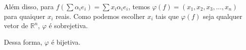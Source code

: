\documentclass[leqno]{article}
\begin{document}
\begin{enumerate}
\begin{enumerate}
        Além disso, para $f(\sum\alpha_ie_i)=\sum x_i\alpha_ie_i$, temos $\varphi(f)=(x_1,x_2,x_3,\dots,x_n)$ para quaiquer $x_i$ reais. Como podemos escolher $x_i$ tais que $\varphi(f)$ seja qualquer vetor de $\mathbb{R}^n$, $\varphi$ é sobrejetiva.
        
        Dessa forma, $\varphi$ é bijetiva.
    \end{enumerate}
    
\end{enumerate}

 
\end{document}
